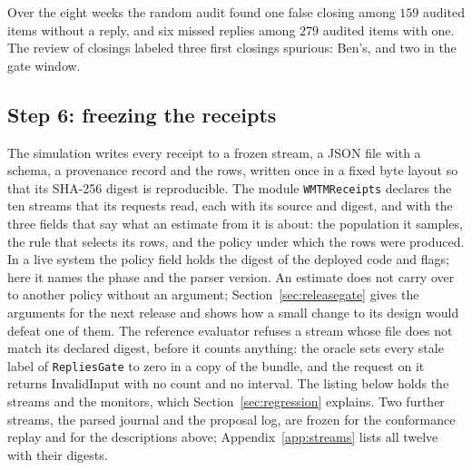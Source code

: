 \documentclass[11pt]{article}
\newcommand{\code}[1]{\texttt{#1}}
\theoremstyle{definition}
\theoremstyle{plain}
\begin{document}
Over the eight weeks the random audit found one false closing among $159$ audited items without a
reply, and six missed replies among $279$ audited items with one. The review of closings labeled
three first closings spurious: Ben's, and two in the gate window.

\subsection{Step 6: freezing the receipts}\label{sec:freeze}

The simulation writes every receipt to a frozen stream, a JSON file with a schema, a provenance
record and the rows, written once in a fixed byte layout so that its SHA-256 digest is
reproducible. The module \code{WMTMReceipts} declares the ten streams that its requests read, each
with its source and digest, and with the three fields that say what an estimate from it is about:
the population it samples, the rule that selects its rows, and the policy under which the rows
were produced. In a live system the policy field holds the digest of the deployed code and flags;
here it names the phase and the parser version. An estimate does not carry over to another policy
without an argument; Section~\ref{sec:releasegate} gives the arguments for the next release and
shows how a small change to its design would defeat one of them. The reference evaluator refuses a stream whose file does not match its declared
digest, before it counts anything: the oracle sets every stale label of \code{RepliesGate} to zero
in a copy of the bundle, and the request on it returns InvalidInput with no count and no interval. The listing below holds the streams and the monitors, which
Section~\ref{sec:regression} explains. Two further streams, the parsed journal and the proposal log,
are frozen for the conformance replay and for the descriptions above; Appendix~\ref{app:streams}
lists all twelve with their digests.
\end{document}
